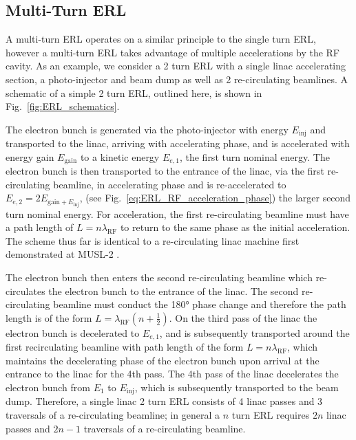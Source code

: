 \documentclass[../main.tex]{subfiles}
\begin{document}
\subsection{Multi-Turn ERL}
\label{sec:multi_turn_ERL}

A multi-turn ERL operates on a similar principle to the single turn ERL, however a multi-turn ERL takes advantage of multiple accelerations by the RF cavity. As an example, we consider a 2 turn ERL with a single linac accelerating section, a photo-injector and beam dump as well as 2 re-circulating beamlines. A schematic of a simple 2 turn ERL, outlined here, is shown in Fig.~\ref{fig:ERL_schematics}.  

The electron bunch is generated via the photo-injector with energy $E_{\mathrm{inj}}$ and transported to the linac, arriving with accelerating phase, and is accelerated with energy gain $E_{\mathrm{gain}}$ to a kinetic energy $E_{e,1}$, the first turn nominal energy. The electron bunch is then transported to the entrance of the linac, via the first re-circulating beamline, in accelerating phase and is re-accelerated to $E_{e,2}=2E_{\mathrm{gain}+E_{\mathrm{inj}}}$, (see Fig.~\ref{eq:ERL_RF_acceleration_phase}) the larger second turn nominal energy. For acceleration, the first re-circulating beamline must have a path length of $L = n\lambda_{\mathrm{RF}}$ to return to the same phase as the initial acceleration. The scheme thus far is identical to a re-circulating linac machine first demonstrated at MUSL-2 \cite{axel1977status}.

The electron bunch then enters the second re-circulating beamline which re-circulates the electron bunch to the entrance of the linac. The second re-circulating beamline must conduct the 180\si{\degree} phase change and therefore the path length is of the form $L=\lambda_{\mathrm{RF}}\left(n+\frac{1}{2}\right)$. On the third pass of the linac the electron bunch is decelerated to $E_{e,1}$, and is subsequently transported around the first recirculating beamline with path length of the form $L=n\lambda_{\mathrm{RF}}$, which maintains the decelerating phase of the electron bunch upon arrival at the entrance to the linac for the 4th pass. The 4th pass of the linac decelerates the electron bunch from $E_{1}$ to $E_{\mathrm{inj}}$, which is subsequently transported to the beam dump. Therefore, a single linac 2 turn ERL consists of 4 linac passes and 3 traversals of a re-circulating beamline; in general a $n$ turn ERL requires $2n$ linac passes and $2n-1$ traversals of a re-circulating beamline.
\end{document}
